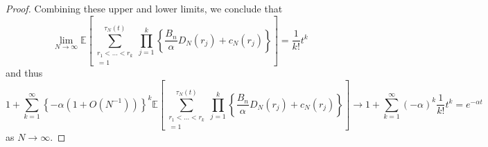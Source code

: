 \documentclass{article}
\newcommand{\E}{\mathbb{E}}
\newcommand{\1}[1]{\mathbb{I}_{#1}}
\begin{document}
\begin{proof}
Combining these upper and lower limits, we conclude that
\begin{equation}
\lim_{N\to\infty} \E \left[ \sum_{\substack{r_1<\dots<r_k \\ =1}}^{\tau_N(t)}\prod_{j=1}^k 
\left\{ \frac{B_n}{\alpha} D_N(r_j) + c_N(r_j) \right\} \right]
= \frac{1}{k!} t^k
\end{equation}
and thus
\begin{equation}
1 + \sum_{k=1}^\infty \left\{- \alpha (1+O(N^{-1}))\right\}^k \E \left[ \sum_{\substack{r_1<\dots<r_k \\ =1}}^{\tau_N(t)}\prod_{j=1}^k 
\left\{ \frac{B_n}{\alpha} D_N(r_j) + c_N(r_j) \right\} \right]
\longrightarrow 1+ \sum_{k=1}^\infty (-\alpha)^k \frac{1}{k!} t^k
= e^{-\alpha t}
\end{equation}
as $N\to\infty$.



\end{proof}
\end{document}
